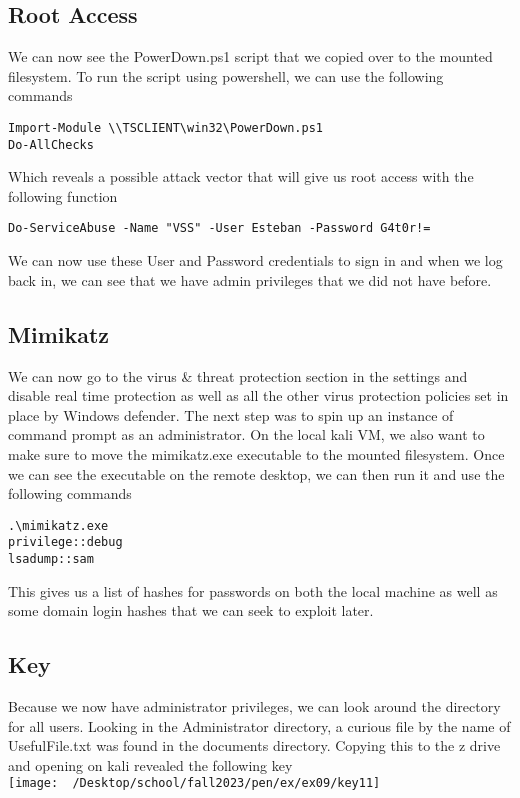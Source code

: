 \documentclass[notitlepage]{article}
\begin{document}
    \subsection{Root Access}
    We can now see the PowerDown.ps1 script that we copied over to the mounted filesystem. To run the script using powershell, we can use the following commands
    \begin{verbatim}
Import-Module \\TSCLIENT\win32\PowerDown.ps1
Do-AllChecks
    \end{verbatim}
    Which reveals a possible attack vector that will give us root access with the following function
    \begin{verbatim}
Do-ServiceAbuse -Name "VSS" -User Esteban -Password G4t0r!=
    \end{verbatim}
    We can now use these User and Password credentials to sign in and when we log back in, we can see that we have admin privileges that we did not have before.

    \subsection{Mimikatz}
    We can now go to the virus \& threat protection section in the settings and disable real time protection as well as all the other virus protection policies set in place
    by Windows defender. The next step was to spin up an instance of command prompt as an administrator. On the local kali VM, we also want to make sure to move the mimikatz.exe executable
    to the mounted filesystem. Once we can see the executable on the remote desktop, we can then run it and use the following commands
    \begin{verbatim}
.\mimikatz.exe
privilege::debug
lsadump::sam
    \end{verbatim}
    This gives us a list of hashes for passwords on both the local machine as well as some domain login hashes that we can seek to exploit later.

    \subsection{Key}
    Because we now have administrator privileges, we can look around the directory for all users. Looking in the Administrator directory, a curious file by the name of UsefulFile.txt was found
    in the documents directory. Copying this to the z drive and opening on kali revealed the following key \\
\texttt{[image: ~/Desktop/school/fall2023/pen/ex/ex09/key11]}
\end{document}
